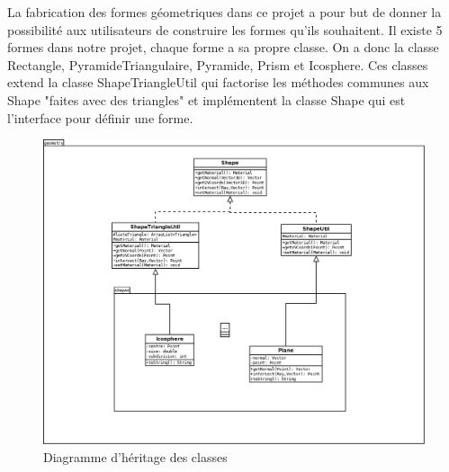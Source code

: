\documentclass[12pt]{article}
\begin{document}
La fabrication des formes géometriques dans ce projet a pour but de donner la possibilité aux utilisateurs de construire les formes qu'ils souhaitent.
Il existe 5 formes dans notre projet, chaque forme a sa propre classe. On a donc la classe Rectangle, PyramideTriangulaire, Pyramide, Prism et Icosphere.
Ces classes extend la classe ShapeTriangleUtil qui factorise les méthodes communes aux Shape "faites avec des triangles"  et  implémentent la classe Shape qui est l'interface pour définir une forme.

\begin{figure}[ht]
\begin{center}
\includegraphics[scale=\umlscale]{./diagrammes/package_geometry.png}
\caption{Diagramme d'h\'eritage des classes}
\end{center}
\end{figure}
\end{document}
